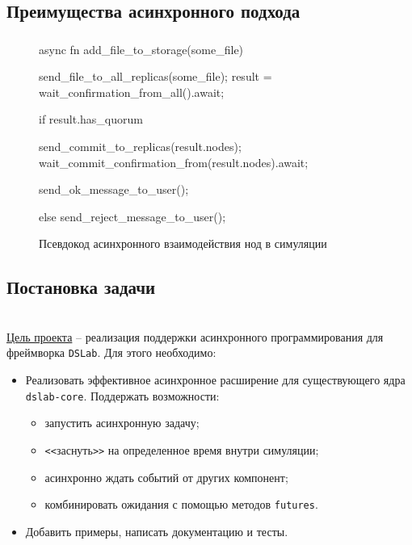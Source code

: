 \documentclass[t]{beamer}  %
\begin{document}
	\subsection{Преимущества асинхронного подхода}
	\begin{frame}[fragile]
		\frametitle{\insertsection} 
		\framesubtitle{\insertsubsection}

		\begin{figure}
			\footnotesize
			\centering
			\begin{rustcode}
async fn add_file_to_storage(some_file) {
  send_file_to_all_replicas(some_file);
  result = wait_confirmation_from_all().await;

  if result.has_quorum {
    send_commit_to_replicas(result.nodes);
    wait_commit_confirmation_from(result.nodes).await;

    send_ok_message_to_user();
  } else {
    send_reject_message_to_user();
  }
}
			\end{rustcode}
			\caption*{Псевдокод асинхронного взаимодействия нод в симуляции}
		\end{figure}


	\end{frame}

	\subsection{Постановка задачи}
	\begin{frame}
		\frametitle{\insertsection} 
		\framesubtitle{\insertsubsection}

		\vspace{0.3cm}
		\begin{columns}
			\begin{column}{1.05\linewidth}
				\underline{Цель проекта} -- реализация поддержки асинхронного программирования для фреймворка \texttt{DSLab}. Для этого необходимо:
				\vspace{3pt}
				\begin{itemize}
					\setlength{\itemsep}{1em}
					\item Реализовать эффективное асинхронное расширение для существующего ядра \texttt{dslab-core}. Поддержать возможности:
					\begin{itemize}
						\item запустить асинхронную задачу;
						\item \texttt{<\textless}заснуть\texttt{>\textgreater} на определенное время внутри симуляции;
						\item асинхронно ждать событий от других компонент;
						\item комбинировать ожидания с помощью методов \texttt{futures}.
					\end{itemize}
					\item Добавить примеры, написать документацию и тесты.
				\end{itemize}
			\end{column}
		\end{columns}
	\end{frame}
\end{document}

